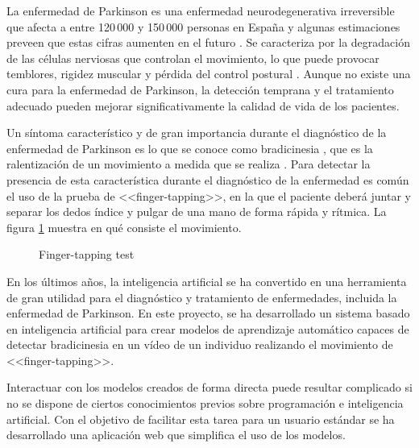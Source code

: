 \label{cha:Introducción}

La enfermedad de Parkinson es una enfermedad neurodegenerativa irreversible que
afecta a entre 120\,000 y 150\,000 personas en España \cite{santos2021present} y
algunas estimaciones preveen que estas cifras aumenten en el futuro
\cite{sen2021futuro}. Se caracteriza por la degradación de las células nerviosas
que controlan el movimiento, lo que puede provocar temblores, rigidez muscular y
pérdida del control postural \cite{eswiki:148845196}. Aunque no existe una cura
para la enfermedad de Parkinson, la detección temprana y el tratamiento adecuado
pueden mejorar significativamente la calidad de vida de los pacientes.

Un síntoma característico y de gran importancia durante el diagnóstico de la
enfermedad de Parkinson es lo que se conoce como bradicinesia
\cite{postuma2015mds}, que es la ralentización de un movimiento a medida que se
realiza \cite{berardelli2001pathophysiology}. Para detectar la presencia de esta
característica durante el diagnóstico de la enfermedad es común el uso de la
prueba de <<finger-tapping>>, en la que el paciente deberá juntar y separar los
dedos índice y pulgar de una mano de forma rápida y rítmica. La figura
\ref{fig:finger-tapping-test} muestra en qué consiste el movimiento.

\begin{figure}[H]
    \centering
    \caption{Finger-tapping test}
    \label{fig:finger-tapping-test}
\end{figure}

En los últimos años, la inteligencia artificial se ha convertido en una
herramienta de gran utilidad para el diagnóstico y tratamiento de enfermedades,
incluida la enfermedad de Parkinson. En este proyecto, se ha desarrollado un
sistema basado en inteligencia artificial para crear modelos de aprendizaje
automático capaces de detectar bradicinesia en un vídeo de un individuo
realizando el movimiento de <<finger-tapping>>.

Interactuar con los modelos creados de forma directa puede resultar complicado
si no se dispone de ciertos conocimientos previos sobre programación e
inteligencia artificial. Con el objetivo de facilitar esta tarea para un usuario
estándar se ha desarrollado una aplicación web que simplifica el uso de los
modelos.

